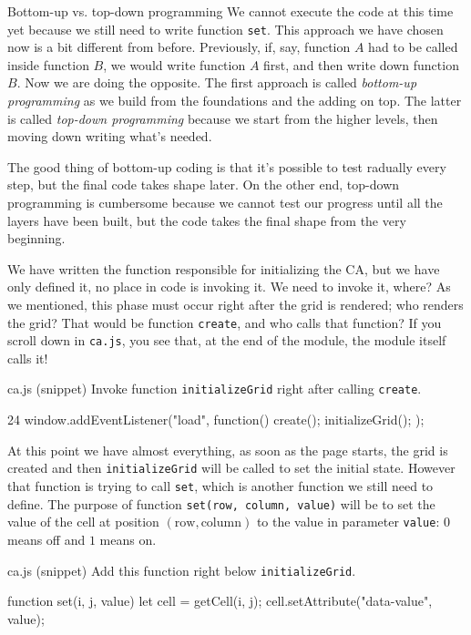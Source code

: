 \begin{important}{Bottom-up vs. top-down programming}
We cannot execute the code at this time yet because we still need to write function \texttt{set}.
This approach we have chosen now is a bit different from before. Previously, if, say, function $A$ had to
be called inside function $B$, we would write function $A$ first, and then write down function $B$. Now we are
doing the opposite. The first approach is called \textit{bottom-up programming}
as we build from the foundations and the adding on top.
The latter is called \textit{top-down programming} because we start from the higher levels, then moving down
writing what's needed.

The good thing of bottom-up coding is that it's possible to test radually every step, but the final code takes
shape later. On the other end, top-down programming is cumbersome because we cannot test our progress until
all the layers have been built, but the code takes the final shape from the very beginning.
\end{important}

We have written the function responsible for initializing the CA, but we have only defined it, no place in code
is invoking it. We need to invoke it, where? As we mentioned, this phase must occur right after the grid is
rendered; who renders the grid? That would be function \texttt{create}, and who calls that function? If you
scroll down in \texttt{ca.js}, you see that, at the end of the module, the module itself calls it!

\begin{programcode}{ca.js (snippet)}
Invoke function \texttt{initializeGrid} right after calling \texttt{create}.
\begin{codeh1}{2}{4}
window.addEventListener("load", function(){
  create();
  initializeGrid();
});
\end{codeh1}
\end{programcode}

At this point we have almost everything, as soon as the page starts, the grid is created and then
\texttt{initializeGrid} will be called to set the initial state. However that function is trying to
call \texttt{set}, which is another function we still need to define. The purpose of function
\texttt{set(row, column, value)} will be to set the value of the cell at position
$(\text{row}, \text{column})$ to the value in parameter \texttt{value}: $0$ means off and $1$ means on.

\begin{programcode}{ca.js (snippet)}
Add this function right below \texttt{initializeGrid}.
\begin{code}
function set(i, j, value) {
  let cell = getCell(i, j);
  cell.setAttribute("data-value", value);
}
\end{code}
\end{programcode}

